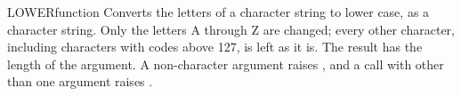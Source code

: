 \begin{XbaseEntry}{LOWER}{function}
Converts the letters of a character string to lower case, as a character string.
\Syntax
{}
\Usage
Only the letters A through Z are changed; every other character, including characters with codes above 127, is left as it is. The result has the length of the argument. A non-character argument raises , and a call with other than one argument raises .
\Examples
{}
\end{XbaseEntry}

